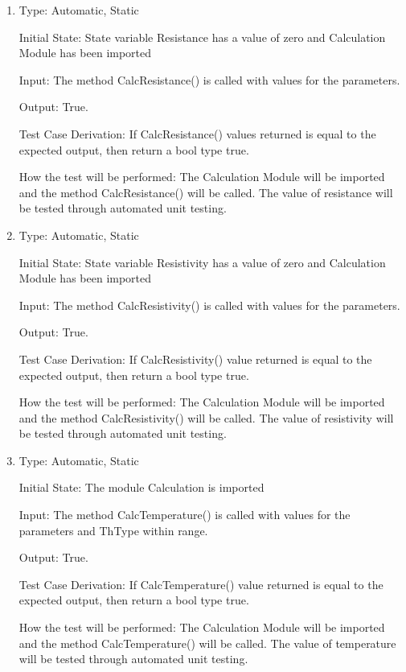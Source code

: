 \documentclass[12pt, titlepage]{article}
\begin{document}
\begin{enumerate}[{UT-C}1.]

  \item
  
  Type: Automatic, Static 

  Initial State: State variable Resistance has a value of zero and Calculation Module has been imported

  Input: The method CalcResistance() is called  with values for the parameters. 

  Output: True.

  Test Case Derivation: If CalcResistance() values returned is equal to the expected output, then return a bool type true.

  How the test will be performed: The Calculation Module will be imported and the method CalcResistance() will be called. The value of resistance will be tested through automated unit testing.

  \item
  
  Type: Automatic, Static 

  Initial State: State variable Resistivity has a value of zero and Calculation Module has been imported

  Input: The method CalcResistivity() is called  with values for the parameters. 

  Output: True.

  Test Case Derivation: If CalcResistivity() value returned is equal to the expected output, then return a bool type true.

  How the test will be performed: The Calculation Module will be imported and the method CalcResistivity() will be called. The value of resistivity will be tested through automated unit testing.
            
  \item
  
  Type: Automatic, Static 

  Initial State:  The module Calculation is imported

  Input: The method CalcTemperature() is called  with values for the parameters and ThType within range. 

  Output: True.

  Test Case Derivation: If CalcTemperature() value returned is equal to the expected output, then return a bool type true.

  How the test will be performed: The Calculation Module will be imported and the method CalcTemperature() will be called. The value of temperature will be tested through automated unit testing.
  

\end{enumerate}
\end{document}
